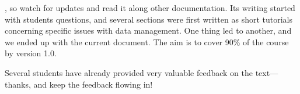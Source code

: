 , so watch for updates and read it along other documentation. Its writing started with students questions, and several sections were first written as short tutorials concerning specific issues with data management. One thing led to another, and we ended up with the current document. The aim is to cover 90\% of the course by version 1.0.%

	Several students have already provided very valuable feedback on the text—thanks, and keep the feedback flowing in!%
